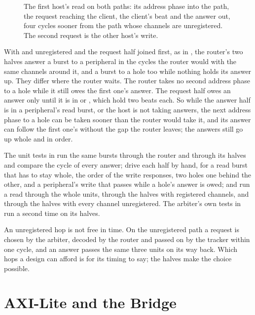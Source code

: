 \documentclass[journal,9pt]{IEEEtran}
\begin{document}
\begin{figure}[t]
\centering

\caption{The first host's read on both paths: its address phase into
the path, the request reaching the client, the client's beat and the
answer out, four cycles sooner from the path whose channels are
unregistered. The second request is the other host's write.}
\label{fig:a-halves}
\end{figure}



With  and  unregistered and the request half joined
first, as in , the router's two halves answer a burst to a
peripheral in the cycles the router would with the same channels
around it, and a burst to a hole too while nothing holds its answer
up. They differ where the router waits. The router takes no second
address phase to a hole while it still owes the first one's answer.
The request half owes an answer only until it is in  or
, which hold two beats each. So while the answer half is in a
peripheral's read burst, or the host is not taking answers, the next
address phase to a hole can be taken sooner than the router would take
it, and its answer can follow the first one's without the gap the
router leaves; the answers still go up whole and in order.

The unit tests in  run the same
bursts through the router and through its halves and compare the cycle
of every answer; drive each half by hand, for a read burst that has to
stay whole, the order of the write responses, two holes one behind the
other, and a peripheral's write that passes while a hole's answer is
owed; and run a read through the whole units, through the halves with
registered channels, and through the halves with every channel
unregistered. The arbiter's own tests in
 run a second time on its halves.

An unregistered hop is not free in time. On the unregistered path a
request is chosen by the arbiter, decoded by the router and passed on
by the tracker within one cycle, and an answer passes the same three
units on its way back. Which hops a design can afford is for its
timing to say; the halves make the choice possible.

\section{AXI-Lite and the Bridge}
\label{sec:a-lite}
\end{document}
